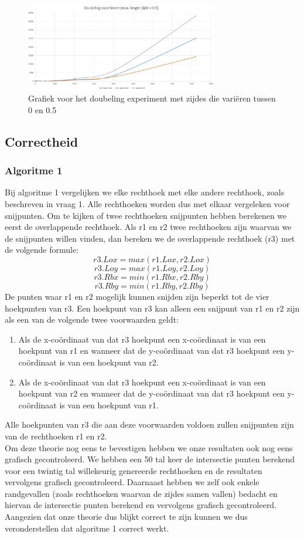 \documentclass[11pt,a4paper,titlepage]{article}
\begin{document}
				\begin{figure}[H]
				\centering
				\includegraphics[width=0.75\textwidth]{zijde05.JPG}
				\caption{\label{fig:convR}Grafiek voor het doubeling experiment met zijdes die variëren tussen 0 en 0.5}
				\end{figure}
		\subsection{Correctheid}
			\subsubsection{Algoritme 1}
				Bij algoritme 1 vergelijken we elke rechthoek met elke andere rechthoek, zoals beschreven in vraag 1.  Alle rechthoeken worden dus met elkaar vergeleken voor snijpunten. Om te kijken of twee rechthoeken snijpunten hebben berekenen we eerst de overlappende rechthoek.  Als r1 en r2 twee rechthoeken zijn waarvan we de snijpunten willen vinden, dan bereken we de overlappende rechthoek (r3) met de volgende formule:
					$$r3.Lox = max(r1.Lox, r2.Lox)$$
					$$r3.Loy = max(r1.Loy, r2.Loy)$$
					$$r3.Rbx = min(r1.Rbx, r2.Rby)$$
					$$r3.Rby = min(r1.Rby, r2.Rby)$$
			De punten waar r1 en r2 mogelijk kunnen snijden zijn beperkt tot de vier hoekpunten van r3. Een hoekpunt van r3 kan alleen een snijpunt van r1 en r2 zijn als een van de volgende twee voorwaarden geldt:
				\begin{enumerate}
					\item Als de x-coördinaat van dat r3 hoekpunt een x-coördinaat is van een hoekpunt van r1 en wanneer dat de y-coördinaat van dat r3 hoekpunt een y-coördinaat is van een hoekpunt van r2.
					\item Als de x-coördinaat van dat r3 hoekpunt een x-coördinaat is van een hoekpunt van r2 en wanneer dat de y-coördinaat van dat r3 hoekpunt een y-coördinaat is van een hoekpunt van r1.
				\end{enumerate}
			Alle hoekpunten van r3 die aan deze voorwaarden voldoen zullen snijpunten zijn van de rechthoeken r1 en r2.  \\
			Om deze theorie nog eens te bevestigen hebben we onze resultaten ook nog eens grafisch gecontroleerd. We hebben een 50 tal keer de intersectie punten berekend voor een twintig tal willekeurig genereerde rechthoeken en de resultaten vervolgens grafisch gecontroleerd. Daarnaast hebben we zelf ook enkele randgevallen (zoals rechthoeken waarvan de zijdes samen vallen) bedacht en hiervan de intersectie punten berekend en vervolgens grafisch gecontroleerd. \\
			Aangezien dat onze theorie dus blijkt correct te zijn kunnen we dus veronderstellen dat algoritme 1 correct werkt.
\end{document}
